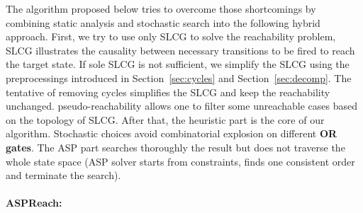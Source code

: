 The algorithm proposed below tries to overcome those shortcomings by combining static analysis and stochastic search into the following hybrid approach.
First, we try to use only SLCG to solve the reachability problem, SLCG illustrates the causality between necessary transitions to be fired to reach the target state.
If sole SLCG is not sufficient, we simplify the SLCG using the preprocessings introduced in Section~\ref{sec:cycles} and Section~\ref{sec:decomp}. 
The tentative of removing cycles simplifies the SLCG and keep the reachability unchanged. 
pseudo-reachability allows one to filter some unreachable cases based on the topology of SLCG. 
After that, the heuristic part is the core of our algorithm.
Stochastic choices avoid combinatorial explosion on different \textbf{OR gates}.
The ASP part searches thoroughly the result but does not traverse the whole state space (ASP solver starts from constraints, finds one consistent order and terminate the search). 

\paragraph{{\bf ASPReach}:}

